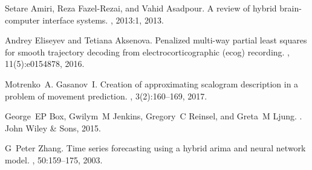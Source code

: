 \documentclass[12pt,twoside]{article}
\begin{document}
\begin{thebibliography}{10}
	Setare Amiri, Reza Fazel-Rezai, and Vahid Asadpour.
	\newblock A review of hybrid brain-computer interface systems.
	, 2013:1, 2013.
	
	Andrey Eliseyev and Tetiana Aksenova.
	\newblock Penalized multi-way partial least squares for smooth trajectory
	decoding from electrocorticographic (ecog) recording.
	, 11(5):e0154878, 2016.
	
	Motrenko~A. Gasanov~I.
	\newblock Creation of approximating scalogram description in a problem of
	movement prediction.
	, 3(2):160--169,
	2017.
	
	George~EP Box, Gwilym~M Jenkins, Gregory~C Reinsel, and Greta~M Ljung.
	.
	\newblock John Wiley \& Sons, 2015.
	
	G~Peter Zhang.
	\newblock Time series forecasting using a hybrid arima and neural network
	model.
	, 50:159--175, 2003.
	
\end{thebibliography}
\end{document}
